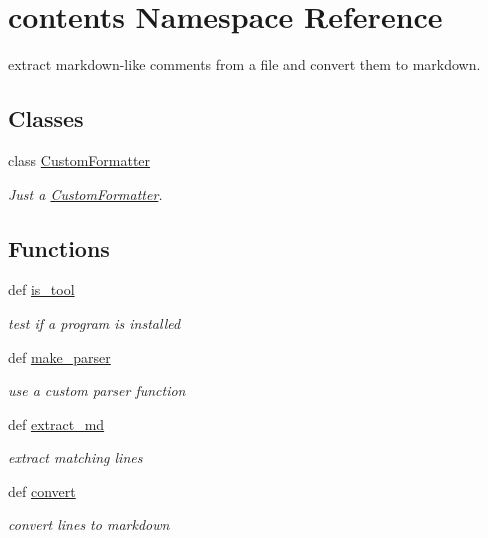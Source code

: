 \hypertarget{namespacecontents}{\section{contents Namespace Reference}
\label{namespacecontents}
}


extract markdown-\/like comments from a file and convert them to markdown.  


\subsection*{Classes}
\begin{DoxyCompactItemize}
\item 
class \hyperlink{classcontents_1_1CustomFormatter}{Custom\+Formatter}
\begin{DoxyCompactList}\small\item\em Just a \hyperlink{classcontents_1_1CustomFormatter}{Custom\+Formatter}. \end{DoxyCompactList}\end{DoxyCompactItemize}
\subsection*{Functions}
\begin{DoxyCompactItemize}
\item 
def \hyperlink{namespacecontents_a986752a0ad57c53588c295374a24f590}{is\+\_\+tool}
\begin{DoxyCompactList}\small\item\em test if a program is installed \end{DoxyCompactList}\item 
def \hyperlink{namespacecontents_a41e3414c2e2d8b2356559e3578a692ac}{make\+\_\+parser}
\begin{DoxyCompactList}\small\item\em use a custom parser function \end{DoxyCompactList}\item 
def \hyperlink{namespacecontents_ae51159210045e618b2ce3a841a9a4cd1}{extract\+\_\+md}
\begin{DoxyCompactList}\small\item\em extract matching lines \end{DoxyCompactList}\item 
def \hyperlink{namespacecontents_a0d85f8135ed9472f4f2e3b5f7283e824}{convert}
\begin{DoxyCompactList}\small\item\em convert lines to markdown \end{DoxyCompactList}\end{DoxyCompactItemize}
